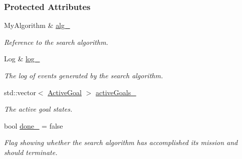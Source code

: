 \subsubsection*{Protected Attributes}
\begin{DoxyCompactItemize}
\item 
My\+Algorithm \& \hyperlink{structslb_1_1ext_1_1policy_1_1goalHandler_1_1MultipleGoal_af1bef5dff9b8838f8584d047b1b1d160}{alg\+\_\+}\hypertarget{structslb_1_1ext_1_1policy_1_1goalHandler_1_1MultipleGoal_af1bef5dff9b8838f8584d047b1b1d160}{}\label{structslb_1_1ext_1_1policy_1_1goalHandler_1_1MultipleGoal_af1bef5dff9b8838f8584d047b1b1d160}

\begin{DoxyCompactList}\small\item\em Reference to the search algorithm. \end{DoxyCompactList}\item 
Log \& \hyperlink{structslb_1_1ext_1_1policy_1_1goalHandler_1_1MultipleGoal_a7b97c4fb1903ba24f55e039117f5831d}{log\+\_\+}\hypertarget{structslb_1_1ext_1_1policy_1_1goalHandler_1_1MultipleGoal_a7b97c4fb1903ba24f55e039117f5831d}{}\label{structslb_1_1ext_1_1policy_1_1goalHandler_1_1MultipleGoal_a7b97c4fb1903ba24f55e039117f5831d}

\begin{DoxyCompactList}\small\item\em The log of events generated by the search algorithm. \end{DoxyCompactList}\item 
std\+::vector$<$ \hyperlink{structslb_1_1ext_1_1policy_1_1goalHandler_1_1MultipleGoal_ab5c8ba5693e69007544a7e9e4a48f7fa}{Active\+Goal} $>$ \hyperlink{structslb_1_1ext_1_1policy_1_1goalHandler_1_1MultipleGoal_a91425351c210df8d0a005b5267fcf408}{active\+Goals\+\_\+}\hypertarget{structslb_1_1ext_1_1policy_1_1goalHandler_1_1MultipleGoal_a91425351c210df8d0a005b5267fcf408}{}\label{structslb_1_1ext_1_1policy_1_1goalHandler_1_1MultipleGoal_a91425351c210df8d0a005b5267fcf408}

\begin{DoxyCompactList}\small\item\em The active goal states. \end{DoxyCompactList}\item 
bool \hyperlink{structslb_1_1ext_1_1policy_1_1goalHandler_1_1MultipleGoal_a83ff9c346859ddb97663edf05c1fdb51}{done\+\_\+} = false\hypertarget{structslb_1_1ext_1_1policy_1_1goalHandler_1_1MultipleGoal_a83ff9c346859ddb97663edf05c1fdb51}{}\label{structslb_1_1ext_1_1policy_1_1goalHandler_1_1MultipleGoal_a83ff9c346859ddb97663edf05c1fdb51}

\begin{DoxyCompactList}\small\item\em Flag showing whether the search algorithm has accomplished its mission and should terminate. \end{DoxyCompactList}\end{DoxyCompactItemize}


